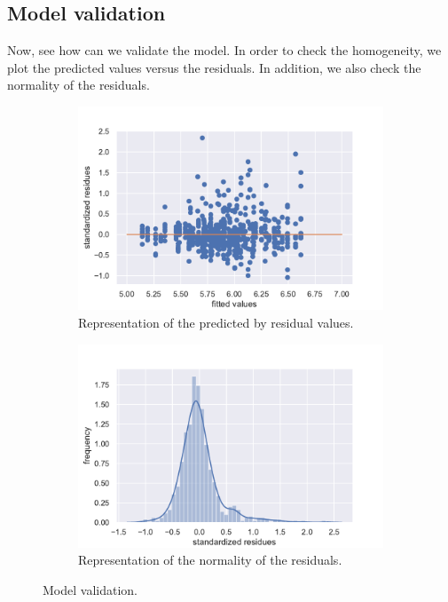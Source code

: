 \documentclass{article}
\begin{document}
\subsection{Model validation}
Now, see how can we validate the model. In order to check the homogeneity, we plot the predicted values versus the residuals. In addition, we also check the normality of the residuals.
\begin{figure}[H]
\centering
\begin{subfigure}{.5\textwidth}
  \centering
  \includegraphics[width=1\linewidth]{./images/homo_mod1.pdf}
  \caption{Representation of the predicted by residual values.}
  \label{fig:homo_mod1}
\end{subfigure}%
\begin{subfigure}{.5\textwidth}
  \centering
  \includegraphics[width=1\linewidth, clip,trim={0cm 0cm 0cm 0.6cm} ]{./images/resid_norm.pdf}
  \caption{Representation of the normality of the residuals.}
  \label{fig:resid}
\end{subfigure}
\caption{Model validation.}
\label{fig:valid_1}
\end{figure}
\end{document}

